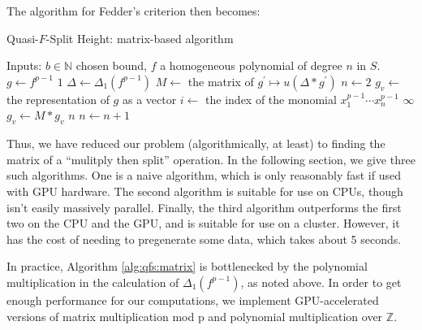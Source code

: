 The algorithm for Fedder's criterion then becomes:

\begin{algorithm}[H]
\caption{Quasi-\(F\)-Split Height: matrix-based algorithm}
\label{alg:qfs:matrix}
\begin{algorithmic}[1]
\State Inputs: \(b \in \mathbb{N}\) chosen bound, \(f\) a homogeneous
	polynomial of degree \(n\) in \(S\).
\State \(g \gets f^{p-1}\) 
    \State \Return \(1\) 
\EndIf
\State \(\Delta \gets \Delta_{1}(f^{p-1})\) 
\State \(M \gets\) the matrix of  \(g^{\prime} \mapsto u(\Delta * g^{\prime})\)
\State \(n \gets 2\) 
\State \(g_{v} \gets\) the representation of \(g\) as a vector
\State \(i \gets \) the index of the monomial \(x_{1}^{p-1}\cdots x_{n}^{p-1}\)
        \State \Return \(\infty\)
    \EndIf
    \State \(g_{v} \gets M * g_{v}\) 
        \State \Return \(n\) 
    \EndIf
    \State \(n \gets n + 1\)
\EndWhile
\end{algorithmic}
\end{algorithm}

Thus, we have reduced our problem (algorithmically, at least)
to finding the matrix of a ``mulitply then split'' operation.
In the following section, we give three such algorithms.
One is a naive algorithm, which is only 
reasonably fast if used with GPU hardware. 
The second algorithm is suitable for use on CPUs,
though isn't easily massively parallel.
Finally, the third algorithm 
outperforms the first two on the CPU and the GPU,
and is suitable for use on a cluster. 
However, it has the cost of needing to pregenerate some
data, which takes about 5 seconds.

In practice, Algorithm \ref{alg:qfs:matrix} is bottlenecked
by the polynomial multiplication in the calculation of 
\(\Delta_{1}(f^{p-1})\), as noted above. 
In order to get enough performance for our computations,
we implement GPU-accelerated versions of
matrix multiplication mod p and polynomial multiplication
over \(\mathbb{Z}\).

